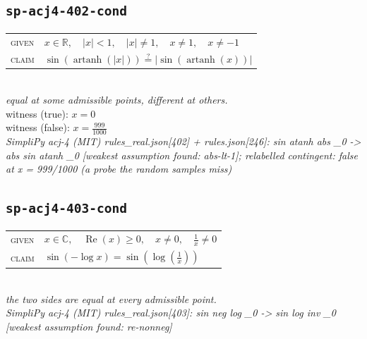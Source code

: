 \documentclass[11pt]{article}
\begin{document}
\subsection*{\texttt{sp-acj4-402-cond}}
\begin{tabular}{@{}l@{\quad}l@{}}
\textsc{given} & $x \in \mathbb{R},\quad \left|x\right| < 1,\quad \left|x\right| \neq 1,\quad x \neq 1,\quad x \neq -1$ \\[4pt]
\textsc{claim} & $\displaystyle \sin\left(\operatorname{artanh}\left(\left|x\right|\right)\right) \overset{?}{=} \left|\sin\left(\operatorname{artanh}\left(x\right)\right)\right|$ \\
\end{tabular}\\[2pt]
{\small\emph{equal at some admissible points, different at others.}}\\
{\footnotesize\color{gray}witness (true): $x = 0$}\\
{\footnotesize\color{gray}witness (false): $x = \frac{999}{1000}$}\\
\emph{SimpliPy acj-4 (MIT) rules\_real.json[402] + rules.json[246]: sin atanh abs \_0  ->  abs sin atanh \_0  [weakest assumption found: abs-lt-1]; relabelled contingent: false at x = 999/1000 (a probe the random samples miss)}\\

\subsection*{\texttt{sp-acj4-403-cond}}
\begin{tabular}{@{}l@{\quad}l@{}}
\textsc{given} & $x \in \mathbb{C},\quad \operatorname{Re}\left(x\right) \ge 0,\quad x \neq 0,\quad \frac{1}{x} \neq 0$ \\[4pt]
\textsc{claim} & $\displaystyle \sin\left(-\log x\right) = \sin\left(\log\left(\frac{1}{x}\right)\right)$ \\
\end{tabular}\\[2pt]
{\small\emph{the two sides are equal at every admissible point.}}\\
\emph{SimpliPy acj-4 (MIT) rules\_real.json[403]: sin neg log \_0  ->  sin log inv \_0  [weakest assumption found: re-nonneg]}\\
\end{document}
